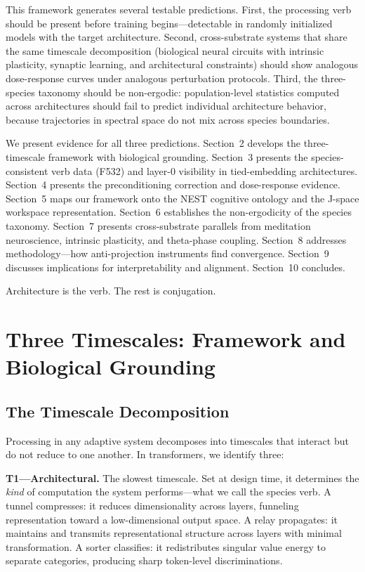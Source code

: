 \documentclass[12pt]{article}
\begin{document}
This framework generates several testable predictions. First, the processing verb should be present before training begins---detectable in randomly initialized models with the target architecture. Second, cross-substrate systems that share the same timescale decomposition (biological neural circuits with intrinsic plasticity, synaptic learning, and architectural constraints) should show analogous dose-response curves under analogous perturbation protocols. Third, the three-species taxonomy should be non-ergodic: population-level statistics computed across architectures should fail to predict individual architecture behavior, because trajectories in spectral space do not mix across species boundaries.

We present evidence for all three predictions. Section~2 develops the three-timescale framework with biological grounding. Section~3 presents the species-consistent verb data (F532) and layer-0 visibility in tied-embedding architectures. Section~4 presents the preconditioning correction and dose-response evidence. Section~5 maps our framework onto the NEST cognitive ontology and the J-space workspace representation. Section~6 establishes the non-ergodicity of the species taxonomy. Section~7 presents cross-substrate parallels from meditation neuroscience, intrinsic plasticity, and theta-phase coupling. Section~8 addresses methodology---how anti-projection instruments find convergence. Section~9 discusses implications for interpretability and alignment. Section~10 concludes.

Architecture is the verb. The rest is conjugation.

\section{Three Timescales: Framework and Biological Grounding}

\subsection{The Timescale Decomposition}

Processing in any adaptive system decomposes into timescales that interact but do not reduce to one another. In transformers, we identify three:

\textbf{T1---Architectural.} The slowest timescale. Set at design time, it determines the \emph{kind} of computation the system performs---what we call the species verb. A tunnel compresses: it reduces dimensionality across layers, funneling representation toward a low-dimensional output space. A relay propagates: it maintains and transmits representational structure across layers with minimal transformation. A sorter classifies: it redistributes singular value energy to separate categories, producing sharp token-level discriminations.
\end{document}
